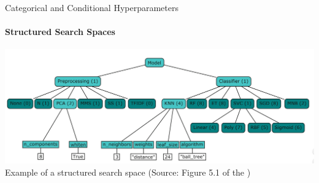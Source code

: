 \begin{frame}[c]{Categorical and Conditional Hyperparameters}
\framesubtitle{Structured Search Spaces}
\begin{center}
    \includegraphics[width=.9\linewidth, height=0.9\textheight, keepaspectratio=true]{w06_hpo_bo/images/categ_cond_params/Conditional Parameters AutoML Book.png}
    \newline
    Example of a structured search space (Source: Figure 5.1 of the )
\end{center}
\end{frame}
